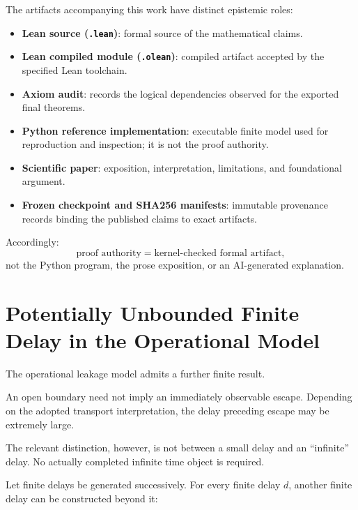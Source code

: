\documentclass[11pt,a4paper]{article}
\begin{document}
The artifacts accompanying this work have distinct epistemic roles:

\begin{itemize}

\item \textbf{Lean source (\texttt{.lean})}: formal source of the
mathematical claims.

\item \textbf{Lean compiled module (\texttt{.olean})}: compiled artifact
accepted by the specified Lean toolchain.

\item \textbf{Axiom audit}: records the logical dependencies observed
for the exported final theorems.

\item \textbf{Python reference implementation}: executable finite model
used for reproduction and inspection; it is not the proof authority.

\item \textbf{Scientific paper}: exposition, interpretation, limitations,
and foundational argument.

\item \textbf{Frozen checkpoint and SHA256 manifests}: immutable
provenance records binding the published claims to exact artifacts.

\end{itemize}

Accordingly:
\[
\boxed{
\text{proof authority}
=
\text{kernel-checked formal artifact},
}
\]
not the Python program, the prose exposition, or an AI-generated
explanation.




\section{Potentially Unbounded Finite Delay in the Operational Model}

The operational leakage model admits a further finite result.

An open boundary need not imply an immediately observable escape.
Depending on the adopted transport interpretation, the delay preceding
escape may be extremely large.

The relevant distinction, however, is not between a small delay and an
``infinite'' delay. No actually completed infinite time object is
required.

Let finite delays be generated successively. For every finite delay
\(d\), another finite delay can be constructed beyond it:
\end{document}
